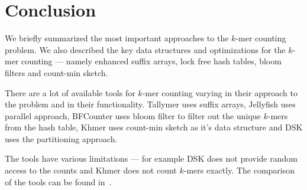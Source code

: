 
\section{Conclusion}

We briefly summarized the most important approaches to the $k$-mer counting problem. We also described the key data structures and optimizations for the $k$-mer counting --- namely enhanced suffix arrays, lock free hash tables, bloom filters and count-min sketch.

There are a lot of available tools for $k$-mer counting varying in their approach to the problem and in their functionality. Tallymer uses suffix arrays, Jellyfish uses parallel approach, BFCounter uses bloom filter to filter out the unique $k$-mers from the hash table, Khmer uses count-min sketch as it's data structure and DSK uses the partitioning approach.

The tools have various limitations --- for example DSK does not provide random access to the counts and Khmer does not count $k$-mers exactly.
The comparison of the tools can be found in~\cite{khmer}.
